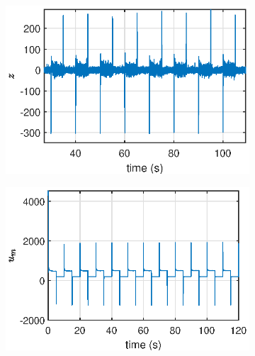 \begin{figure}[H]
    \begin{minipage}{0.49\textwidth}
        \begin{figure}[H]
            \centering
            \includegraphics[width=\textwidth]{Part2/figs/4_figs/results/z.eps}
        \end{figure}
    \end{minipage}
    \begin{minipage}{0.49\textwidth}
        \begin{figure}[H]
            \centering
            \includegraphics[width=\textwidth]{Part2/figs/4_figs/results/um.eps}
        \end{figure}
    \end{minipage}
\end{figure}
